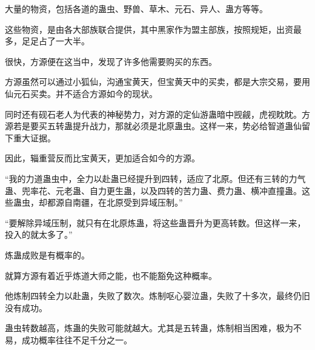 \begin{this_body}
大量的物资，包括各道的蛊虫、野兽、草木、元石、异人、蛊方等等。

这些物资，是由各大部族联合提供，其中黑家作为盟主部族，按照规矩，出资最多，足足占了一大半。

很快，方源便在这当中，发现了许多他需要购买的东西。

方源虽然可以通过小狐仙，沟通宝黄天，但宝黄天中的买卖，都是大宗交易，要用仙元石买卖。并不适合方源如今的现状。

同时还有砚石老人为代表的神秘势力，对方源的定仙游蛊暗中觊觎，虎视眈眈。方源若是要买五转蛊提升战力，那就必须是北原蛊虫。这样一来，势必给智道蛊仙留下重大证据。

因此，辎重营反而比宝黄天，更加适合如今的方源。

“我的力道蛊虫中，全力以赴蛊已经提升到四转，适应了北原。但还有三转的力气蛊、兜率花、元老蛊、自力更生蛊，以及四转的苦力蛊、费力蛊、横冲直撞蛊。这些蛊虫，却都源自南疆，在北原受到异域压制。”

“要解除异域压制，就只有在北原炼蛊，将这些蛊晋升为更高转数。但这样一来，投入的就太多了。”

炼蛊成败是有概率的。

就算方源有着近乎炼道大师之能，也不能豁免这种概率。

他炼制四转全力以赴蛊，失败了数次。炼制呕心婴泣蛊，失败了十多次，最终仍旧没有成功。

蛊虫转数越高，炼蛊的失败可能就越大。尤其是五转蛊，炼制相当困难，极为不易，成功概率往往不足千分之一。

\end{this_body}

